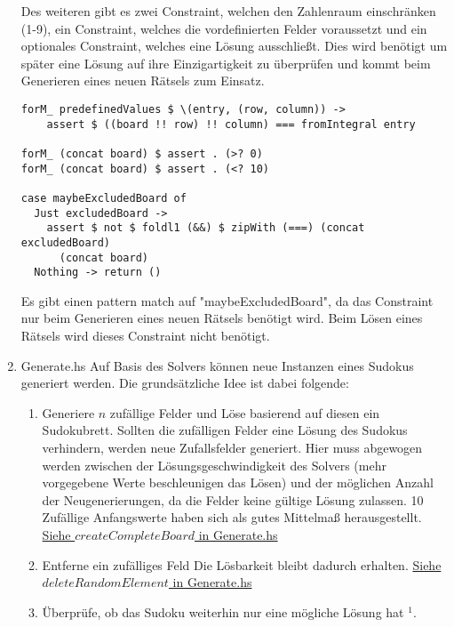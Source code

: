 \begin{enumerate}[(1)]
    Des weiteren gibt es zwei Constraint, welchen den Zahlenraum einschränken (1-9), ein Constraint, welches die vordefinierten Felder voraussetzt und ein optionales Constraint, welches eine Lösung ausschließt. Dies wird benötigt um später eine Lösung auf ihre Einzigartigkeit zu überprüfen und kommt beim Generieren eines neuen Rätsels zum Einsatz.
    \begin{lstlisting}
forM_ predefinedValues $ \(entry, (row, column)) ->
    assert $ ((board !! row) !! column) === fromIntegral entry

forM_ (concat board) $ assert . (>? 0)
forM_ (concat board) $ assert . (<? 10)

case maybeExcludedBoard of
  Just excludedBoard ->
    assert $ not $ foldl1 (&&) $ zipWith (===) (concat excludedBoard)
      (concat board)
  Nothing -> return ()
    \end{lstlisting}
    Es gibt einen pattern match auf "maybeExcludedBoard", da das Constraint nur beim Generieren eines neuen Rätsels benötigt wird. Beim Lösen eines Rätsels wird dieses Constraint nicht benötigt.
    \item Generate.hs \newline
    Auf Basis des Solvers können neue Instanzen eines Sudokus generiert werden. Die grundsätzliche Idee ist dabei folgende:
        \begin{enumerate}[(1)]
            \item Generiere \(n\) zufällige Felder und Löse basierend auf diesen ein Sudokubrett. \newline
            Sollten die zufälligen Felder eine Lösung des Sudokus verhindern, werden neue Zufallsfelder generiert. Hier muss abgewogen werden zwischen der Lösungsgeschwindigkeit des Solvers (mehr vorgegebene Werte beschleunigen das Lösen) und der möglichen Anzahl der Neugenerierungen, da die Felder keine gültige Lösung zulassen. 10 Zufällige Anfangswerte haben sich als gutes Mittelmaß herausgestellt. \newline
            \underline{Siehe \(createCompleteBoard\) in Generate.hs}
            \item Entferne ein zufälliges Feld \newline
            Die Lösbarkeit bleibt dadurch erhalten. \newline
            \underline{Siehe \(deleteRandomElement\) in Generate.hs}
            \item Überprüfe, ob das Sudoku weiterhin nur eine mögliche Lösung hat $^1$.
            \begin{enumerate}

\end{enumerate}
\end{enumerate}
\end{enumerate}

